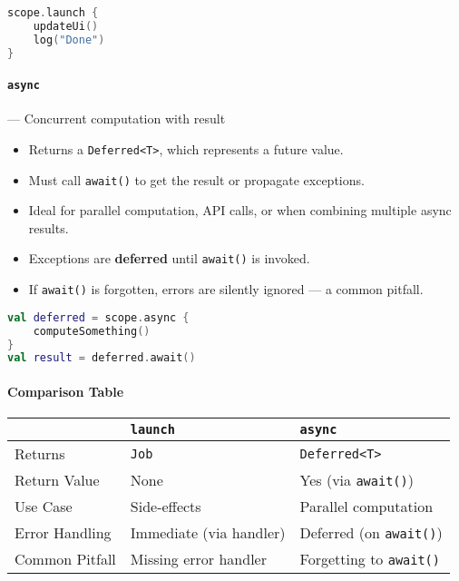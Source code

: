 \documentclass[a4paper,12pt]{article}
\begin{document}
\begin{lstlisting}[language=Kotlin]
scope.launch {
    updateUi()
    log("Done")
}
\end{lstlisting}

\paragraph{\texttt{async}} — Concurrent computation with result

\begin{itemize}
  \item Returns a \texttt{Deferred<T>}, which represents a future value.
  \item Must call \texttt{await()} to get the result or propagate exceptions.
  \item Ideal for parallel computation, API calls, or when combining multiple async results.
  \item Exceptions are \textbf{deferred} until \texttt{await()} is invoked.
  \item If \texttt{await()} is forgotten, errors are silently ignored — a common pitfall.
\end{itemize}

\begin{lstlisting}[language=Kotlin]
val deferred = scope.async {
    computeSomething()
}
val result = deferred.await()
\end{lstlisting}

\paragraph{Comparison Table}

\begin{table}[h!]
\centering
\begin{tabular}{|l|l|l|}
\hline
 & \texttt{launch} & \texttt{async} \\
\hline
Returns & \texttt{Job} & \texttt{Deferred<T>} \\
Return Value & None & Yes (via \texttt{await()}) \\
Use Case & Side-effects & Parallel computation \\
Error Handling & Immediate (via handler) & Deferred (on \texttt{await()}) \\
Common Pitfall & Missing error handler & Forgetting to \texttt{await()} \\
\hline
\end{tabular}
\end{table}
\end{document}
